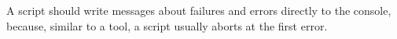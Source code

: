 \subsubsection{}
A script should write messages about failures and errors directly to the console, because, similar to a tool, a script usually aborts at the first error.


